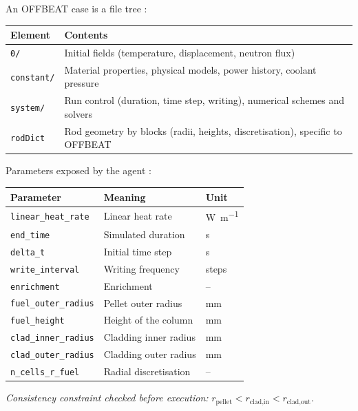 \noindent An OFFBEAT case is a file tree :

\vspace{0.3cm}
\noindent
\begin{tabularx}{\textwidth}{@{}lX@{}}
\toprule
\textbf{Element} & \textbf{Contents}\\
\midrule
\texttt{0/} & Initial fields (temperature, displacement, neutron flux)\\
\texttt{constant/} & Material properties, physical models, power history,
  coolant pressure\\
\texttt{system/} & Run control (duration, time step, writing), numerical
  schemes and solvers\\
\texttt{rodDict} & Rod geometry by blocks (radii, heights, discretisation),
  specific to OFFBEAT\\
\bottomrule
\end{tabularx}

\vspace{0.6cm}

\noindent Parameters exposed by the agent :

\vspace{0.3cm}
\noindent
\begin{tabularx}{\textwidth}{@{}lXl@{}}
\toprule
\textbf{Parameter} & \textbf{Meaning} & \textbf{Unit}\\
\midrule
\texttt{linear\_heat\_rate} & Linear heat rate & \si{\watt\per\metre}\\
\texttt{end\_time} & Simulated duration & \si{\second}\\
\texttt{delta\_t} & Initial time step & \si{\second}\\
\texttt{write\_interval} & Writing frequency & steps\\
\texttt{enrichment} & Enrichment & --\\
\texttt{fuel\_outer\_radius} & Pellet outer radius & \si{\milli\metre}\\
\texttt{fuel\_height} & Height of the column & \si{\milli\metre}\\
\texttt{clad\_inner\_radius} & Cladding inner radius & \si{\milli\metre}\\
\texttt{clad\_outer\_radius} & Cladding outer radius & \si{\milli\metre}\\
\texttt{n\_cells\_r\_fuel} & Radial discretisation & --\\
\bottomrule
\end{tabularx}

\vspace{0.4cm}
\noindent
\textit{Consistency constraint checked before execution:}
$r_{\text{pellet}} < r_{\text{clad,in}} < r_{\text{clad,out}}$.


